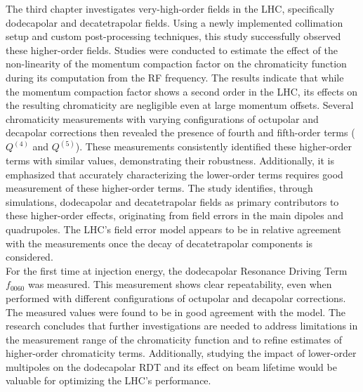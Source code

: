 {%
The third chapter investigates very-high-order fields in the LHC, specifically dodecapolar and
decatetrapolar fields. Using a newly implemented collimation setup and custom post-processing
techniques, this study successfully observed these higher-order fields. Studies were conducted to
estimate the effect of the non-linearity of the momentum compaction factor on the chromaticity
function during its computation from the RF frequency. The results indicate that while the momentum
compaction factor shows a second order in the LHC, its effects on the resulting chromaticity are
negligible even at large momentum offsets. Several chromaticity measurements with varying
configurations of octupolar and decapolar corrections then revealed the presence of fourth and
fifth-order terms ($Q^{(4)}$ and $Q^{(5)}$). These measurements consistently identified these
higher-order terms with similar values, demonstrating their robustness. Additionally, it is
emphasized that accurately characterizing the lower-order terms requires good measurement of these
higher-order terms. The study identifies, through simulations, dodecapolar and decatetrapolar fields
as primary contributors to these higher-order effects, originating from field errors in the main
dipoles and quadrupoles. The LHC's field error model appears to be in relative agreement with the
measurements once the decay of decatetrapolar components is considered.
\\
\indent
For the first time at injection energy, the dodecapolar Resonance Driving Term $f_{0060}$ was
measured. This measurement shows clear repeatability, even when performed with different
configurations of octupolar and decapolar corrections. The measured values were found to be in good
agreement with the model. The research concludes that further investigations are needed to address
limitations in the measurement range of the chromaticity function and to refine estimates of
higher-order chromaticity terms. Additionally, studying the impact of lower-order multipoles on the
dodecapolar RDT and its effect on beam lifetime would be valuable for optimizing the LHC's
performance.

}
